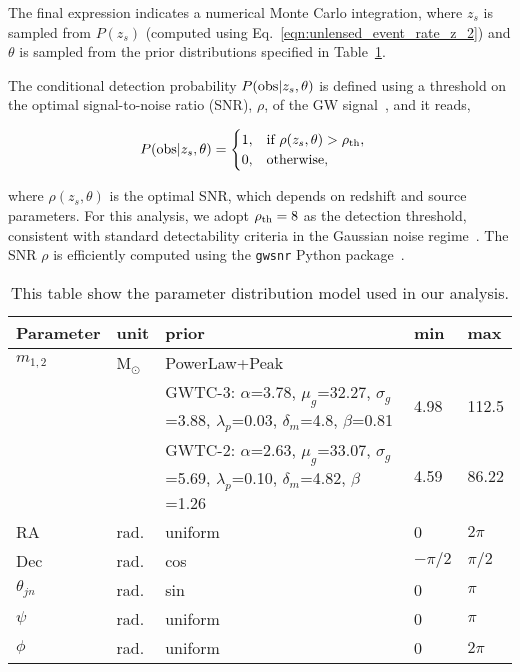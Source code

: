 \documentclass[aps,prd,twocolumn,superscriptaddress,groupedaddress,nofootinbib,showpacs,eqsecnum]{revtex4-1}
\begin{document}
The final expression indicates a numerical Monte Carlo integration, where $z_s$ is sampled from $P(z_s)$ (computed using Eq.~\ref{eqn:unlensed_event_rate_z_2}) and $\theta$ is sampled from the prior distributions specified in Table~\ref{table:GW_parameters}.

The conditional detection probability $P({\rm obs}|z_s, \theta)$ is defined using a threshold on the optimal signal-to-noise ratio (SNR), $\rho$, of the GW signal~\cite{Allen2012}, and it reads,

\begin{align}
P({\rm obs}|z_s, \theta) &=
\begin{cases}
1, & \text{if } \rho(z_s, \theta) > \rho_{\rm th}, \\
0, & \text{otherwise},
\end{cases}
\end{align}

where $\rho(z_s, \theta)$ is the optimal SNR, which depends on redshift and source parameters. For this analysis, we adopt $\rho_{\rm th} = 8$ as the detection threshold, consistent with standard detectability criteria in the Gaussian noise regime~\cite{Wierda2021}. The SNR $\rho$ is efficiently computed using the \texttt{gwsnr} Python package~\cite{phurailatpam2025gwsnrpythonpackageefficient}.

\begingroup
\renewcommand{\arraystretch}{1.5} %
\begin{center}
\begin{table}[ht!]
\begin{tabular}{|l|l|p{4.5cm}|l|l|}
\hline\hline
Parameter & unit & prior & min & max \\
\hline
$m_{1,2}$        & M$_\odot$ & PowerLaw+Peak &             &          \\
&  & GWTC-3: $\alpha$=3.78, $\mu_g$=32.27, $\sigma_g$=3.88, $\lambda_p$=0.03, $\delta_m$=4.8, $\beta$=0.81 & 4.98            & 112.5         \\
        &  & GWTC-2: $\alpha$=2.63, $\mu_g$=33.07, $\sigma_g$=5.69, $\lambda_p$=0.10, $\delta_m$=4.82, $\beta$=1.26 & 4.59            & 86.22         \\
RA               & rad.      & uniform & 0            & $2\pi$      \\
Dec              & rad.      & cos     & $-\pi/2$     & $\pi/2$     \\
$\theta_{jn}$          & rad.      & sin     & 0            & $\pi$       \\
$\psi$           & rad.      & uniform & 0            & $\pi$       \\
$\phi$         & rad.      & uniform & 0            & $2\pi$      \\
\hline
\end{tabular}
\caption{This table show the parameter distribution model used in our analysis.
}
\label{table:GW_parameters}
\end{table}
\end{center}
\endgroup
\end{document}
